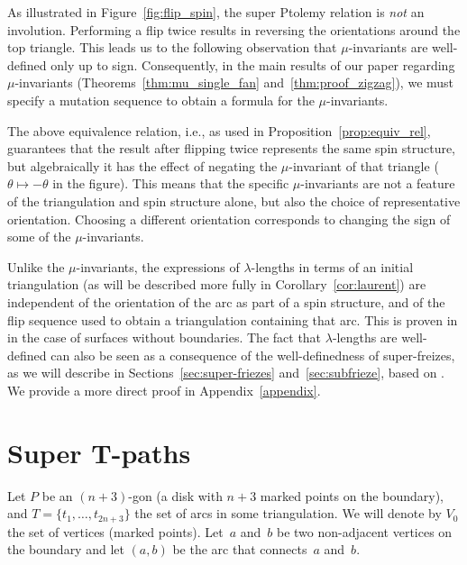 \documentclass[pdftex]{sigma}
\numberwithin{equation}{section}
\begin{document}


As illustrated in Figure~\ref{fig:flip_spin}, the super Ptolemy relation is \emph{not} an involution. Performing a flip
twice results in reversing the orientations around the top triangle. This leads us to the following observation that $\mu$-invariants are well-defined only up to sign. Consequently, in the main results of our paper regarding $\mu$-invariants (Theorems~\ref{thm:mu_single_fan} and~\ref{thm:proof_zigzag}), we must specify a mutation sequence to obtain a formula for the $\mu$-invariants.

\begin{Remark} \label{rem:mu-invariants}\rm
The above equivalence relation, i.e., as used in Proposition~\ref{prop:equiv_rel}, guarantees that the result after flipping twice represents the same spin structure, but algebraically it has the effect of negating the $\mu$-invariant of that triangle
($\theta \mapsto -\theta$ in the figure). This means that the specific $\mu$-invariants are not a feature of the triangulation
and spin structure alone, but also the choice of representative orientation. Choosing a different orientation corresponds to
changing the sign of some of the $\mu$-invariants.
\end{Remark}

\begin{Remark} \label{rem:lambda}\rm
Unlike the $\mu$-invariants, the expressions of $\lambda$-lengths in terms of an initial triangulation (as will be described more fully in Corollary~\ref{cor:laurent}) are independent of the orientation of the arc as part of a spin structure, and of the flip sequence used to obtain a triangulation containing that arc. This is proven in \cite{pz_19} in the case of surfaces without boundaries. The fact that $\lambda$-lengths are well-defined can also be seen as a consequence of the well-definedness of super-freizes, as we will describe in Sections~\ref{sec:super-friezes} and~\ref{sec:subfrieze}, based on \cite{M-GOT15,pz_19}. We provide a more direct proof in Appendix~\ref{appendix}.
\end{Remark}

\section[Super T-paths]{Super $\boldsymbol{T}$-paths}
Let $P$ be an $(n+3)$-gon (a disk with $n+3$ marked points on the boundary), and $T = \{t_1,\dots,t_{2n+3}\}$ the set of arcs in some triangulation.
We will denote by $V_0$ the set of vertices (marked points).
Let~$a$ and~$b$ be two non-adjacent vertices on the boundary and let $(a,b)$ be the arc that connects~$a$ and~$b$.
\end{document}

